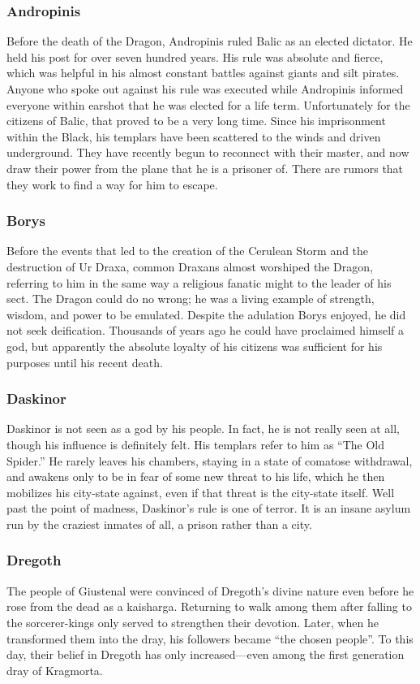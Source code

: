 \subsubsection{Andropinis}
Before the death of the Dragon, Andropinis ruled Balic as an elected dictator. He held his post for over seven hundred years. His rule was absolute and fierce, which was helpful in his almost constant battles against giants and silt pirates. Anyone who spoke out against his rule was executed while Andropinis informed everyone within earshot that he was elected for a life term. Unfortunately for the citizens of Balic, that proved to be a very long time. Since his imprisonment within the Black, his templars have been scattered to the winds and driven underground. They have recently begun to reconnect with their master, and now draw their power from the plane that he is a prisoner of. There are rumors that they work to find a way for him to escape.

\subsubsection{Borys}
Before the events that led to the creation of the Cerulean Storm and the destruction of Ur Draxa, common Draxans almost worshiped the Dragon, referring to him in the same way a religious fanatic might to the leader of his sect. The Dragon could do no wrong; he was a living example of strength, wisdom, and power to be emulated. Despite the adulation Borys enjoyed, he did not seek deification. Thousands of years ago he could have proclaimed himself a god, but apparently the absolute loyalty of his citizens was sufficient for his purposes until his recent death.

\subsubsection{Daskinor}
Daskinor is not seen as a god by his people. In fact, he is not really seen at all, though his influence is definitely felt. His templars refer to him as ``The Old Spider.'' He rarely leaves his chambers, staying in a state of comatose withdrawal, and awakens only to be in fear of some new threat to his life, which he then mobilizes his city-state against, even if that threat is the city-state itself. Well past the point of madness, Daskinor's rule is one of terror. It is an insane asylum run by the craziest inmates of all, a prison rather than a city.

\subsubsection{Dregoth}
The people of Giustenal were convinced of Dregoth's divine nature even before he rose from the dead as a kaisharga. Returning to walk among them after falling to the sorcerer-kings only served to strengthen their devotion. Later, when he transformed them into the dray, his followers became ``the chosen people''. To this day, their belief in Dregoth has only increased---even among the first generation dray of Kragmorta.


